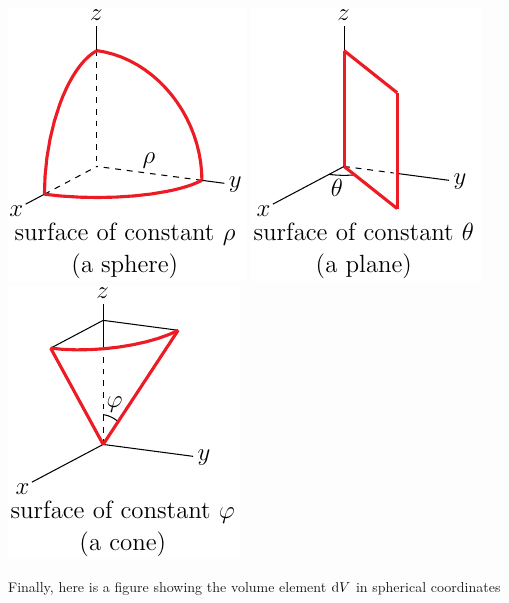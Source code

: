 \begin{wfig}
\begin{center}
    \includegraphics{spher2.pdf}\qquad
    \includegraphics{spher3.pdf}\qquad
    \includegraphics{spher4.pdf}
\end{center}
\end{wfig}
Finally, here is a figure showing the volume element $\mathrm{d}V$ in
spherical coordinates
